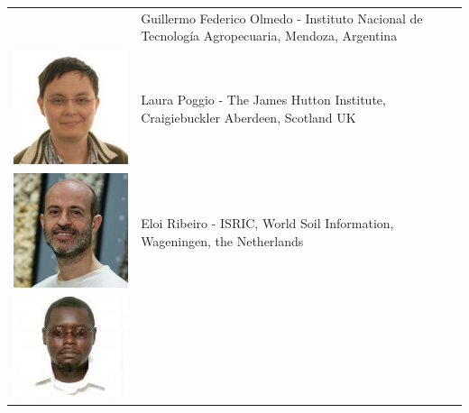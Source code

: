 \documentclass[10pt,b5paper,]{book}
\theoremstyle{definition}
\theoremstyle{definition}
\theoremstyle{definition}
\theoremstyle{remark}
\begin{document}
\begin{longtable}[]{@{}ll@{}}
\begin{minipage}[t]{0.11\columnwidth}
\end{minipage} & \begin{minipage}[t]{0.83\columnwidth}\raggedright
Guillermo Federico Olmedo - Instituto Nacional de Tecnología
Agropecuaria, Mendoza, Argentina\strut
\end{minipage}\tabularnewline
\begin{minipage}[t]{0.11\columnwidth}\raggedright
\includegraphics{contrAuthors/Poggio.jpg}\strut
\end{minipage} & \begin{minipage}[t]{0.83\columnwidth}\raggedright
Laura Poggio - The James Hutton Institute, Craigiebuckler Aberdeen,
Scotland UK\strut
\end{minipage}\tabularnewline
\begin{minipage}[t]{0.11\columnwidth}\raggedright
\includegraphics{contrAuthors/Ribeiro.jpg}\strut
\end{minipage} & \begin{minipage}[t]{0.83\columnwidth}\raggedright
Eloi Ribeiro - ISRIC, World Soil Information, Wageningen, the
Netherlands\strut
\end{minipage}\tabularnewline
\begin{minipage}[t]{0.11\columnwidth}\raggedright
\includegraphics{contrAuthors/Omuto.jpg}\strut

\end{minipage}
\end{longtable}
\end{document}
